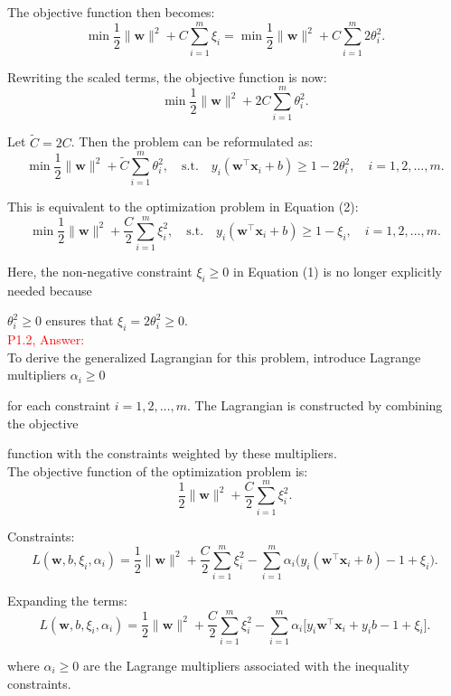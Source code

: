 \documentclass[11pt]{article}
\begin{document}
The objective function then becomes:
\[
\min \frac{1}{2} \|\mathbf{w}\|^2 + C \sum_{i=1}^m \xi_i = \min \frac{1}{2} \|\mathbf{w}\|^2 + C \sum_{i=1}^m 2\theta_i^2.
\]

Rewriting the scaled terms, the objective function is now:
\[
\min \frac{1}{2} \|\mathbf{w}\|^2 + 2C \sum_{i=1}^m \theta_i^2.
\]

Let \( \tilde{C} = 2C \). Then the problem can be reformulated as:
\[
\min \frac{1}{2} \|\mathbf{w}\|^2 + \tilde{C} \sum_{i=1}^m \theta_i^2, \quad 
\text{s.t.} \quad y_i (\mathbf{w}^\top \mathbf{x}_i + b) \geq 1 - 2\theta_i^2, \quad i = 1, 2, \dots, m.
\]

This is equivalent to the optimization problem in Equation (2):
\[
\min \frac{1}{2} \|\mathbf{w}\|^2 + \frac{C}{2} \sum_{i=1}^m \xi_i^2, \quad 
\text{s.t.} \quad y_i (\mathbf{w}^\top \mathbf{x}_i + b) \geq 1 - \xi_i, \quad i = 1, 2, \dots, m.
\]

Here, the non-negative constraint \( \xi_i \geq 0 \) in Equation (1) is no longer explicitly needed because 

\( \theta_i^2 \geq 0 \) ensures that \( \xi_i = 2\theta_i^2 \geq 0 \).\\ 


\textcolor{red}{P1.2, Answer:}\\

To derive the generalized Lagrangian for this problem, introduce Lagrange multipliers \( \alpha_i \geq 0 \) 

for each constraint \( i = 1, 2, \dots, m \). The Lagrangian is constructed by combining the objective 

function with the constraints weighted by these multipliers.\\

The objective function of the optimization problem is:
\[
\frac{1}{2} \|\mathbf{w}\|^2 + \frac{C}{2} \sum_{i=1}^m \xi_i^2.
\]

Constraints:
\[
L(\mathbf{w}, b, \xi_i, \alpha_i) = \frac{1}{2} \|\mathbf{w}\|^2 + \frac{C}{2} \sum_{i=1}^m \xi_i^2 - \sum_{i=1}^m \alpha_i \Big( y_i (\mathbf{w}^\top \mathbf{x}_i + b) - 1 + \xi_i \Big).
\]

Expanding the terms:
\[
L(\mathbf{w}, b, \xi_i, \alpha_i) = \frac{1}{2} \|\mathbf{w}\|^2 + \frac{C}{2} \sum_{i=1}^m \xi_i^2 - \sum_{i=1}^m \alpha_i \big[ y_i \mathbf{w}^\top \mathbf{x}_i + y_i b - 1 + \xi_i \big].
\]

where \( \alpha_i \geq 0 \) are the Lagrange multipliers associated with the inequality constraints.\\
\end{document}
